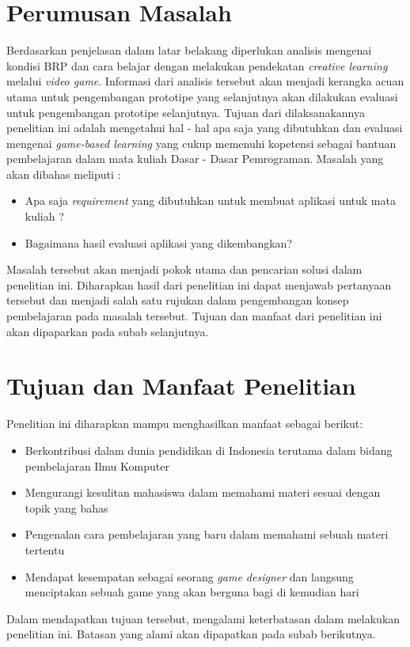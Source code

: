 \section{Perumusan Masalah}
Berdasarkan penjelasan dalam latar belakang diperlukan analisis mengenai kondisi BRP dan cara belajar dengan melakukan pendekatan \textit{creative learning} melalui \textit{video game}. Informasi dari analisis tersebut akan menjadi kerangka acuan utama untuk pengembangan prototipe \game yang selanjutnya akan dilakukan evaluasi untuk pengembangan prototipe selanjutnya.
\linebreak\linebreak
Tujuan dari dilaksanakannya penelitian ini adalah mengetahui hal - hal apa saja yang dibutuhkan dan evaluasi mengenai \textit{game-based learning} yang cukup memenuhi kopetensi sebagai bantuan pembelajaran dalam mata kuliah Dasar - Dasar Pemrograman. Masalah yang akan dibahas meliputi :
\begin{itemize}
	\item Apa saja \textit{requirement} yang dibutuhkan untuk membuat aplikasi \game untuk mata kuliah \ddp?
	\item Bagaimana hasil evaluasi aplikasi \game yang dikembangkan?
\end{itemize}
Masalah tersebut akan menjadi pokok utama dan pencarian solusi dalam penelitian ini. Diharapkan hasil dari penelitian ini dapat menjawab pertanyaan tersebut dan menjadi salah satu rujukan dalam pengembangan konsep pembelajaran pada masalah tersebut. Tujuan dan manfaat dari penelitian ini akan dipaparkan pada subab selanjutnya.

\section{Tujuan dan Manfaat Penelitian}
Penelitian ini diharapkan mampu menghasilkan manfaat sebagai berikut:
\begin{itemize}
	\item Berkontribusi dalam dunia pendidikan di Indonesia terutama dalam bidang pembelajaran Ilmu Komputer
	\item Mengurangi kesulitan mahasiswa dalam memahami materi sesuai dengan topik yang \saya bahas
	\item Pengenalan cara pembelajaran yang baru dalam memahami sebuah materi tertentu
	\item Mendapat kesempatan sebagai seorang \textit{game designer} dan langsung menciptakan sebuah game yang akan berguna bagi \saya di kemudian hari
\end{itemize}
Dalam mendapatkan tujuan tersebut, \Saya mengalami keterbatasan dalam melakukan penelitian ini. Batasan yang \saya alami akan dipapatkan pada subab berikutnya.


